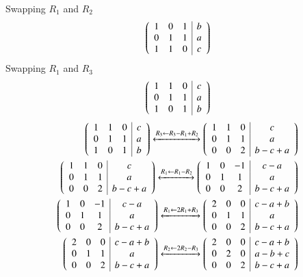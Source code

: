 \documentclass[journal,12pt,twocolumn]{IEEEtran}
\theoremstyle{remark}
\begin{document}
\vspace{0.3cm}
Swapping $R_1$ and $R_2$
\begin{align}
\begin{pmatrix}\begin{array}{ccc|c}
1&0&1&b\\0&1&1&a\\1&1&0&c
\end{array}
\end{pmatrix}
\end{align}
Swapping $R_1$ and $R_3$
\begin{align}
\begin{pmatrix}\begin{array}{ccc|c}
1&1&0&c\\0&1&1&a\\1&0&1&b
\end{array}
\end{pmatrix}
\end{align}
\begin{align}
\begin{pmatrix}\begin{array}{ccc|c}
1&1&0&c\\0&1&1&a\\1&0&1&b
\end{array}
\end{pmatrix}
\xleftrightarrow[]{R_3 \leftarrow R_3 - R_1 + R_2}
\begin{pmatrix}\begin{array}{ccc|c}
1&1&0&c\\0&1&1&a\\0&0&2&b-c+a
\end{array}
\end{pmatrix}\\
\begin{pmatrix}\begin{array}{ccc|c}
1&1&0&c\\0&1&1&a\\0&0&2&b-c+a
\end{array}
\end{pmatrix}
\xleftrightarrow[]{R_1 \leftarrow R_1-R_2}
\begin{pmatrix}\begin{array}{ccc|c}
1&0&-1&c-a\\0&1&1&a\\0&0&2&b-c+a
\end{array}
\end{pmatrix}\\
\begin{pmatrix}\begin{array}{ccc|c}
1&0&-1&c-a\\0&1&1&a\\0&0&2&b-c+a
\end{array}
\end{pmatrix}
\xleftrightarrow[]{R_1 \leftarrow 2R_1+ R_3}
\begin{pmatrix}\begin{array}{ccc|c}
2&0&0&c-a+b \\0&1&1&a \\0&0&2&b-c+a
\end{array}
\end{pmatrix}\\
\begin{pmatrix}\begin{array}{ccc|c}
2&0&0&c-a+b \\0&1&1&a \\0&0&2&b-c+a
\end{array}
\end{pmatrix}
\xleftrightarrow[]{R_2 \leftarrow 2R_2-R_3}
\begin{pmatrix}\begin{array}{ccc|c}
2&0&0&c-a+b \\0&2&0&a-b+c \\0&0&2&b-c+a
\end{array}
\end{pmatrix}
\end{align}
\end{document}
